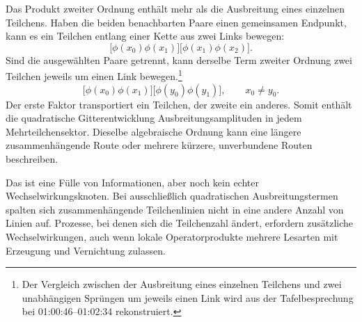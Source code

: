 Das Produkt zweiter Ordnung enthält mehr als die Ausbreitung eines einzelnen Teilchens. Haben die beiden benachbarten Paare einen gemeinsamen Endpunkt, kann es ein Teilchen entlang einer Kette aus zwei Links bewegen:
\begin{equation}
\bigl[\phi(x_0)\phi(x_1)\bigr]
\bigl[\phi(x_1)\phi(x_2)\bigr].
\end{equation}
Sind die ausgewählten Paare getrennt, kann derselbe Term zweiter Ordnung zwei Teilchen jeweils um einen Link bewegen.\footnote{Der Vergleich zwischen der Ausbreitung eines einzelnen Teilchens und zwei unabhängigen Sprüngen um jeweils einen Link wird aus der Tafelbesprechung bei 01:00:46--01:02:34 rekonstruiert.}
\begin{equation}
\bigl[\phi(x_0)\phi(x_1)\bigr]
\bigl[\phi(y_0)\phi(y_1)\bigr],
\qquad x_0\neq y_0.
\end{equation}
Der erste Faktor transportiert ein Teilchen, der zweite ein anderes. Somit enthält die quadratische Gitterentwicklung Ausbreitungsamplituden in jedem Mehrteilchensektor. Dieselbe algebraische Ordnung kann eine längere zusammenhängende Route oder mehrere kürzere, unverbundene Routen beschreiben.

Das ist eine Fülle von Informationen, aber noch kein echter Wechselwirkungsknoten. Bei ausschließlich quadratischen Ausbreitungstermen spalten sich zusammenhängende Teilchenlinien nicht in eine andere Anzahl von Linien auf. Prozesse, bei denen sich die Teilchenzahl ändert, erfordern zusätzliche Wechselwirkungen, auch wenn lokale Operatorprodukte mehrere Lesarten mit Erzeugung und Vernichtung zulassen.

\begin{classroomqa}
\end{classroomqa}


